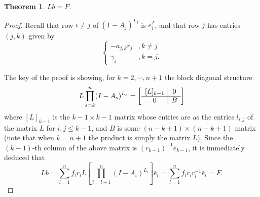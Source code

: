 \documentclass[]{interact}
\theoremstyle{plain}%
\newtheorem{theorem}{Theorem}
\theoremstyle{definition}
\theoremstyle{remark}
\begin{document}
\begin{theorem}
$Lb=F$.
\end{theorem}
\begin{proof}
Recall that row $i\neq j$ of $(1-A_j)^{L_j}$ is $\bar{e}_i^{T}$, and that row $j$ has entries $(j,k)$ given by
\[
\begin{cases}
-a_{j,k}r_j& ,k\neq j\\
\gamma_j & ,k=j.
\end{cases}
\]

The key of the proof is showing, for $k=2,\cdots,n+1$ the block diagonal structure
\[
L\prod_{s=k}^n(I-A_s)^{L_s}=\left[\begin{array}{c | c}
[L]_{k-1} &0 \\ \hline
0& B
\end{array}\right]
\]
where $[L]_{k-1}$ is the $k-1\times k-1$ matrix whose entries are as the entries $l_{i,j}$ of the matrix $L$ for $i,j\leq k-1$, and $B$ is some $(n-k+1)\times (n-k+1)$ matrix (note that when $k=n+1$ the product is simply the matrix $L$). Since the $(k-1)$-th column of the above matrix is $(r_{k-1})^{-1}\bar{e}_{k-1}$, it is immediately deduced that
\[
Lb=\sum_{l=1}^nf_lr_lL\left[ \prod_{i=l+1}^{n}(I-A_i)^{L_i}\right]\bar{e}_l =\sum_{l=1}^nf_lr_lr_l^{-1}\bar{e}_l=F.
\]


\end{proof}
\end{document}
